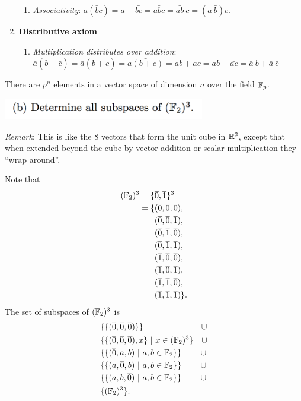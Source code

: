 \documentclass[12pt]{article}
\begin{document}
\begin{mdframed}
\begin{enumerate}
\begin{enumerate}
    \item \textit{Associativity}:
      $\bar a (\bar b \bar c) = \bar a + \bar {bc} = \bar{abc} =
      \bar{ab}~\bar{c} = (\bar a ~ \bar b) \bar{c}$.
    \end{enumerate}
  \item \textbf{Distributive axiom}
    \begin{enumerate}
    \item \textit{Multiplication distributes over addition}: $\bar a (\bar b + \bar c) = \bar a (\bar{b + c}) = \bar{a(b+c)} = \bar{ab +
      ac} = \bar{ab} + \bar{ac} = \bar{a}~\bar{b} + \bar{a}~\bar{c}$
    \end{enumerate}
  \end{enumerate}

There are $p^n$ elements in a vector space of dimension $n$ over the field $\mathbb{F}_p$.
\end{mdframed}
\includegraphics[width=250pt]{img/linear-algebra-a0-1-1-b.png}
\begin{mdframed}
  \textit{Remark}: This is like the 8 vectors that form the unit cube in
  $\mathbb{R}^3$, except that when extended beyond the cube by vector addition or
  scalar multiplication they ``wrap around''.

  Note that
  \begin{align*}
    (\mathbb{F}_2)^3 = \{&\overline 0, \overline 1\}^3\\
             = \{&(\overline 0, \overline 0, \overline 0),\\
                 &(\overline 0, \overline 0, \overline 1),\\
                 &(\overline 0, \overline 1, \overline 0),\\
                 &(\overline 0, \overline 1, \overline 1),\\
                 &(\overline 1, \overline 0, \overline 0),\\
                 &(\overline 1, \overline 0, \overline 1),\\
                 &(\overline 1, \overline 1, \overline 0),\\
                 &(\overline 1, \overline 1, \overline 1)\}.
  \end{align*}
  The set of subspaces of $(\mathbb{F}_2)^3$ is
  \begin{align*}
    &\{\{(\overline 0, \overline 0, \overline 0)\}\} ~~~~~~~~~~~~~~~~~~~~~ \cup\\
    &\{\{(\overline 0, \overline 0, \overline 0), x\} ~|~ x \in (\mathbb{F}_2)^3\} ~~~ \cup\\
    &\{\{(\overline 0, a, b) ~|~ a, b \in \mathbb{F}_2\}\}  ~~~~~~~ \cup\\
    &\{\{(a, \overline 0, b) ~|~ a, b \in \mathbb{F}_2\}\}  ~~~~~~~ \cup\\
    &\{\{(a, b, \overline 0) ~|~ a, b \in \mathbb{F}_2\}\}  ~~~~~~~ \cup\\
    &\{(\mathbb{F}_2)^3\}.
  \end{align*}
\end{mdframed}
\end{document}

